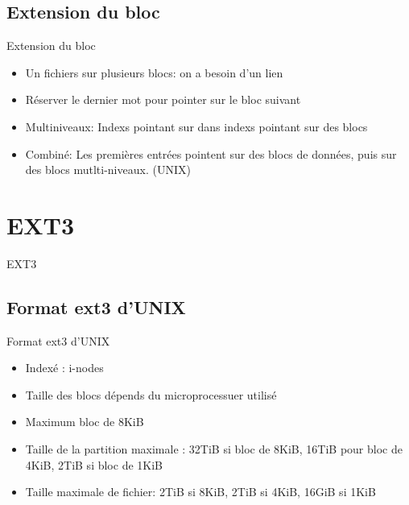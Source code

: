 \subsection{\sectitle}
\begin{frame}{\sectitle}
\def\subsectitle{Extension du bloc}
\subsection{\subsectitle}
\begin{block}{\subsectitle}
\begin{itemize}
    \item Un fichiers sur plusieurs blocs: on a besoin d'un lien
    \item Réserver le dernier mot pour pointer sur le bloc suivant
    \item Multiniveaux: Indexs pointant sur dans indexs pointant sur des blocs
    \item Combiné: Les premières entrées pointent sur des blocs de données, puis
        sur des blocs mutlti-niveaux. (UNIX)
\end{itemize}
\end{block}
\end{frame}

\def\sectitle{EXT3}
\section{\sectitle}
\begin{frame}{\sectitle}
\def\subsectitle{Format ext3 d'UNIX}
\subsection{\subsectitle}
\begin{block}{\subsectitle}
\begin{itemize}
    \item Indexé : i-nodes
    \item Taille des blocs dépends du microprocessuer utilisé
    \item Maximum bloc de 8KiB
    \item Taille de la partition maximale : 32TiB si bloc de 8KiB, 16TiB pour
        bloc de 4KiB, 2TiB si bloc de 1KiB
    \item Taille maximale de fichier: 2TiB si 8KiB, 2TiB si 4KiB, 16GiB si 1KiB
\end{itemize}
\end{block}
\end{frame}


